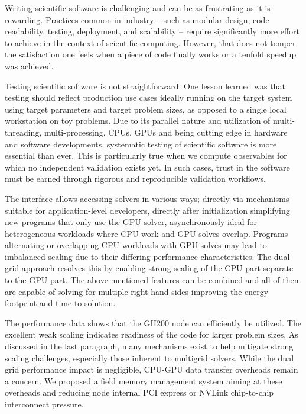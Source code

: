 Writing scientific software is challenging and can be as frustrating as it is rewarding.
Practices common in industry -- such as modular design, code readability, testing, deployment, and scalability -- require significantly more effort to achieve in the context of scientific computing.
However, that does not temper the satisfaction one feels when a piece of code finally works or a tenfold speedup was achieved.

Testing scientific software is not straightforward.
One lesson learned was that testing should reflect production use cases ideally running on the target system using target parameters and target problem sizes, as opposed to a single local workstation on toy problems.
Due to its parallel nature and utilization of multi-threading, multi-processing, CPUs, GPUs and being cutting edge in hardware and software developments, systematic testing of scientific software is more essential than ever.
This is particularly true when we compute observables for which no independent validation exists yet.
In such cases, trust in the software must be earned through rigorous and reproducible validation workflows.

The interface allows accessing solvers in various ways; directly via \openqxd mechanisms suitable for application-level developers, directly after initialization simplifying new programs that only use the GPU solver, asynchronously ideal for heterogeneous workloads where CPU work and GPU solves overlap.
Programs alternating or overlapping CPU workloads with GPU solves may lead to imbalanced scaling due to their differing performance characteristics.
The dual grid approach resolves this by enabling strong scaling of the CPU part separate to the GPU part.
The above mentioned features can be combined and all of them are capable of solving for multiple right-hand sides improving the energy footprint and time to solution.

The performance data shows that the GH200 node can efficiently be utilized.
The excellent weak scaling indicates readiness of the code for larger problem sizes.
As discussed in the last paragraph, many mechanisms exist to help mitigate strong scaling challenges, especially those inherent to multigrid solvers.
While the dual grid performance impact is negligible, CPU-GPU data transfer overheads remain a concern.
We proposed a field memory management system aiming at these overheads and reducing node internal PCI express or NVLink chip-to-chip interconnect pressure.

